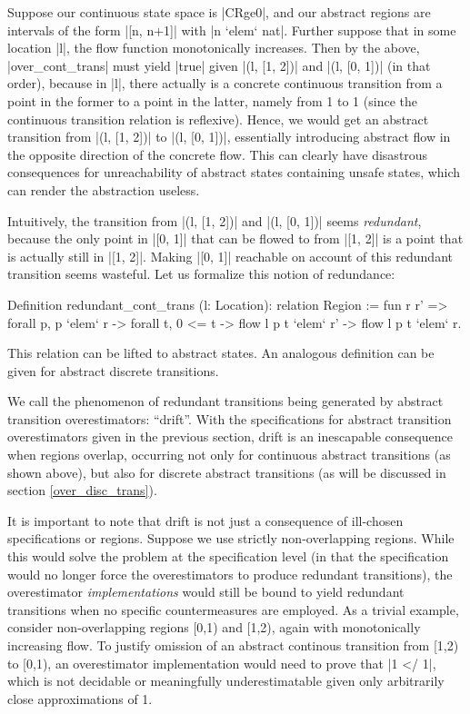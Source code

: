 \documentclass[runningheads]{llncs}
\begin{document}
Suppose our continuous state space is |CRge0|, and our abstract regions are intervals of the form |[n, n+1]| with |n `elem` nat|. Further suppose that in some location |l|, the flow function monotonically increases. Then by the above, |over_cont_trans| must yield |true| given |(l, [1, 2])| and |(l, [0, 1])| (in that order), because in |l|, there actually is a concrete continuous transition from a point in the former to a point in the latter, namely from 1 to 1 (since the continuous transition relation is reflexive). Hence, we would get an abstract transition from |(l, [1, 2])| to |(l, [0, 1])|, essentially introducing abstract flow in the opposite direction of the concrete flow. This can clearly have disastrous consequences for unreachability of abstract states containing unsafe states, which can render the abstraction useless.

Intuitively, the transition from |(l, [1, 2])| and |(l, [0, 1])| seems \emph{redundant}, because the only point in |[0, 1]| that can be flowed to from |[1, 2]| is a point that is actually still in |[1, 2]|. Making |[0, 1]| reachable on account of this redundant transition seems wasteful. Let us formalize this notion of redundance:
\begin{code}
  Definition redundant_cont_trans (l: Location): relation Region
    := fun r r' => forall p, p `elem` r -> forall t, 0 <= t -> flow l p t `elem` r' -> flow l p t `elem` r.
\end{code}
This relation can be lifted to abstract states. An analogous definition can be given for abstract discrete transitions.


We call the phenomenon of redundant transitions being generated by abstract transition overestimators: ``drift''. With the specifications for abstract transition overestimators given in the previous section, drift is an inescapable consequence when regions overlap, occurring not only for continuous abstract transitions (as shown above), but also for discrete abstract transitions (as will be discussed in section \ref{over_disc_trans}).

It is important to note that drift is not just a consequence of ill-chosen specifications or regions. Suppose we use strictly non-overlapping regions. While this would solve the problem at the specification level (in that the specification would no longer force the overestimators to produce redundant transitions), the overestimator \emph{implementations} would still be bound to yield redundant transitions when no specific countermeasures are employed. As a trivial example, consider non-overlapping regions [0,1) and [1,2), again with monotonically increasing flow. To justify omission of an abstract continous transition from [1,2) to [0,1), an overestimator implementation would need to prove that |1 </ 1|, which is not decidable or meaningfully underestimatable given only arbitrarily close approximations of 1.
\end{document}

